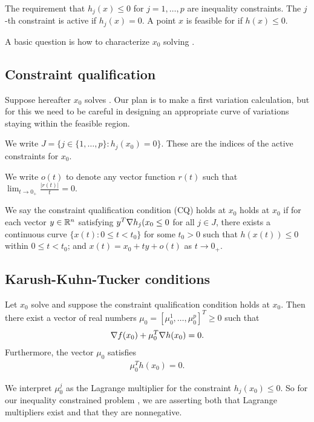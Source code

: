 The requirement that $h_j(x) \le 0$ for $j = 1, \dots, p$ are inequality constraints.
The $j$-th constraint is active if $h_j(x) = 0$.
A point $x$ is feasible for  if $h(x) \le 0$.

A basic question is how to characterize $x_0$ solving .

\subsection{Constraint qualification}

Suppose hereafter $x_0$ solves .
Our plan is to make a first variation calculation, but for this we need to be careful in designing an appropriate curve of variations staying within the feasible region.

We write $J = \{ j \in \{1, \dots, p\} : h_j(x_0) = 0 \}$.
These are the indices of the active constraints for $x_0$.

We write $o(t)$ to denote any vector function $r(t)$ such that $\lim _ {t \to 0_+} \frac{|r(t)|}{t} = 0$.

\begin{definition}
We say the constraint qualification condition (CQ) holds at $x_0$ holds at $x_0$ if for each vector $y \in \mathbb{R}^n$ satisfying $y^T \nabla h_j(x_0 \le 0$ for all $j \in J$, there exists a continuous curve $\{x(t) : 0 \le t < t_0 \}$ for some $t_0 > 0$ such that $h(x(t)) \le 0$ within $0 \le t < t_0$; and $x(t) = x_0 + t y + o(t)$ as $t \to 0_+$.
\end{definition}

\subsection{Karush-Kuhn-Tucker conditions}

\begin{theorem}
Let $x_0$ solve  and suppose the constraint qualification condition holds at $x_0$.
Then there exist a vector of real numbers $\mu_0 = [\mu_0^1, \dots, \mu_0^p]^T \ge 0$ such that 
\begin{align}
\nabla f(x_0) + \mu_0^T \nabla h(x_0) = 0.
\end{align}
Furthermore, the vector $\mu_0$ satisfies
\begin{align}
\mu_0^T h(x_0) = 0.
\end{align}
\end{theorem}

We interpret $\mu_0^j$ as the Lagrange multiplier for the constraint $h_j(x_0) \le 0$. 
So for our inequality constrained problem , we are asserting both that Lagrange multipliers exist and that they are nonnegative.

